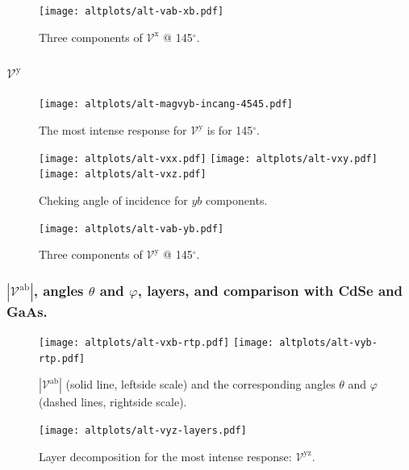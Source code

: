\documentclass[twocolumn]{article}
\let\Oldsubsubsection\subsubsection
\renewcommand{\subsubsection}{\FloatBarrier\Oldsubsubsection}
\begin{document}
\begin{figure}[]
    \centering
    \texttt{[image: altplots/alt-vab-xb.pdf]}
    \caption{Three components of $\mathcal{V}^{\mathrm{x}} $ @ 145$^{\circ}$.}
    \label{fig:alt-vxb}
\end{figure}


\subsubsection{$\mathcal{V}^{\mathrm{y}}$}
\begin{figure}[ht]
    \centering
    \texttt{[image: altplots/alt-magvyb-incang-4545.pdf]}
    \caption{The most intense response for $\mathcal{V}^{\mathrm{y}} $ is for 
    145$^{\circ}$.}
    \label{fig:alt-magvybincang1}
\end{figure}
\begin{figure}[ht]
    \centering
    \texttt{[image: altplots/alt-vxx.pdf]}
    \texttt{[image: altplots/alt-vxy.pdf]}\\
    \texttt{[image: altplots/alt-vxz.pdf]}
    \caption{Cheking angle of incidence for $yb$ components.}
    \label{fig:alt-ybangcomp}
\end{figure}
\begin{figure}[ht]
    \centering
    \texttt{[image: altplots/alt-vab-yb.pdf]}
    \caption{Three components of $\mathcal{V}^{\mathrm{y}} $ @ 145$^{\circ}$.}
    \label{fig:alt-vyb1}
\end{figure}

\subsubsection{$|\mathcal{V}^{\mathrm{ab}}|$, angles
$\theta$ and $\varphi$, layers, and comparison with CdSe and GaAs.}
\begin{figure}[ht]
    \centering
    \texttt{[image: altplots/alt-vxb-rtp.pdf]}
    \texttt{[image: altplots/alt-vyb-rtp.pdf]}
    \caption{$|\mathcal{V}^{\mathrm{ab}}|$ (solid line, leftside scale) and the
    corresponding angles $\theta$ and $\varphi$ (dashed lines, rightside scale).}
    \label{fig:alt-rtp}
\end{figure}

\begin{figure}[ht]
    \centering
    \texttt{[image: altplots/alt-vyz-layers.pdf]}
    \caption{Layer decomposition for the most intense response:
    $\mathcal{V}^{\mathrm{yz}}$.}
    \label{fig:alt-lay}
\end{figure}
\end{document}
